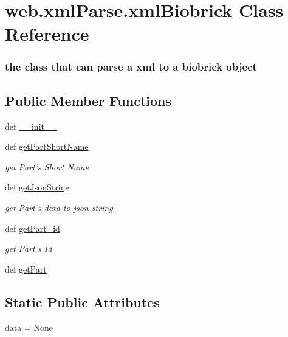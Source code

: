 \hypertarget{classweb_1_1xml_parse_1_1xml_biobrick}{\section{web.\-xml\-Parse.\-xml\-Biobrick Class Reference}
\label{classweb_1_1xml_parse_1_1xml_biobrick}
}


\subsubsection*{the class that can parse a xml to a biobrick object } 


\subsection*{Public Member Functions}
\begin{DoxyCompactItemize}
\item 
def \hyperlink{classweb_1_1xml_parse_1_1xml_biobrick_a62c1b73708521e5eec64b785194a9422}{\-\_\-\-\_\-init\-\_\-\-\_\-}
\item 
def \hyperlink{classweb_1_1xml_parse_1_1xml_biobrick_ae9040f8ed87b2e698cb63e9b4fab3d75}{get\-Part\-Short\-Name}
\begin{DoxyCompactList}\small\item\em get Part's Short Name \end{DoxyCompactList}\item 
def \hyperlink{classweb_1_1xml_parse_1_1xml_biobrick_a3e0ccbf80876c290597452660913b925}{get\-Json\-String}
\begin{DoxyCompactList}\small\item\em get Part's data to json string \end{DoxyCompactList}\item 
def \hyperlink{classweb_1_1xml_parse_1_1xml_biobrick_ad800d3d899a74bb14c654e3368a1f7df}{get\-Part\-\_\-id}
\begin{DoxyCompactList}\small\item\em get Part's Id \end{DoxyCompactList}\item 
def \hyperlink{classweb_1_1xml_parse_1_1xml_biobrick_ace660bfcc46553657af47043911c7490}{get\-Part}
\end{DoxyCompactItemize}
\subsection*{Static Public Attributes}
\begin{DoxyCompactItemize}
\item 
\hyperlink{classweb_1_1xml_parse_1_1xml_biobrick_a5432396f6045ec97745273417f021a26}{data} = None
\end{DoxyCompactItemize}


